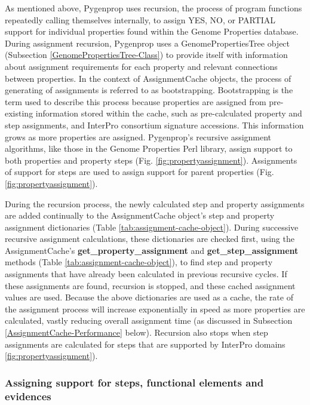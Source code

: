 As mentioned above, Pygenprop uses recursion, the process of program functions repeatedly calling themselves internally, to assign YES, NO, or PARTIAL support for individual properties found within the Genome Properties database. During assignment recursion, Pygenprop uses a GenomePropertiesTree object (Subsection \ref{GenomePropertiesTree-Class}) to provide itself with information about assignment requirements for each property and relevant connections between properties. In the context of AssignmentCache objects, the process of generating of assignments is referred to as bootstrapping. Bootstrapping is the term used to describe this process because properties are assigned from pre-existing information stored within the cache, such as pre-calculated property and step assignments, and InterPro consortium signature accessions. This information grows as more properties are assigned. Pygenprop's recursive assignment algorithms, like those in the Genome Properties Perl library, assign support to both properties and property steps (Fig. \ref{fig:propertyassignment}). Assignments of support for steps are used to assign support for parent properties (Fig. \ref{fig:propertyassignment}).

During the recursion process, the newly calculated step and property assignments are added continually to the AssignmentCache object's step and property assignment dictionaries (Table \ref{tab:assignment-cache-object}). During successive recursive assignment calculations, these dictionaries are checked first, using the AssignmentCache's \textbf{get\_property\_assignment} and \textbf{get\_step\_assignment} methods (Table \ref{tab:assignment-cache-object}), to find step and property assignments that have already been calculated in previous recursive cycles. If these assignments are found, recursion is stopped, and these cached assignment values are used. Because the above dictionaries are used as a cache, the rate of the assignment process will increase exponentially in speed as more properties are calculated, vastly reducing overall assignment time (as discussed in Subsection \ref{AssignmentCache-Performance} below). Recursion also stops when step assignments are calculated for steps that are supported by InterPro domains \ref{fig:propertyassignment}).

\subsubsection{Assigning support for steps, functional elements and evidences}

